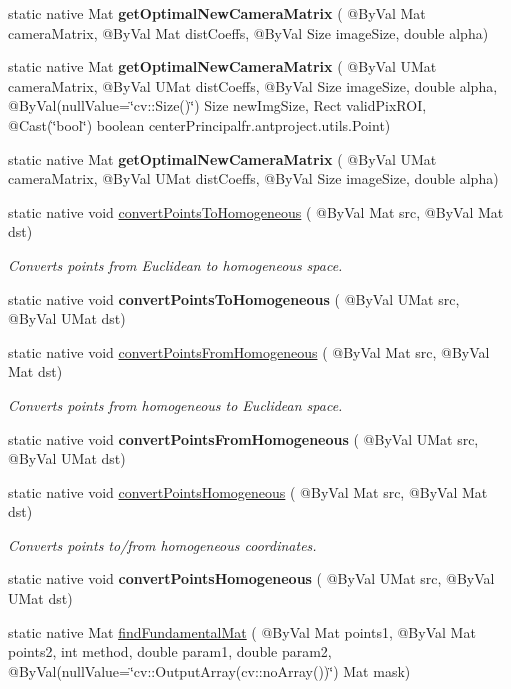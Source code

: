 \begin{DoxyCompactItemize}
static native Mat {\bfseries get\+Optimal\+New\+Camera\+Matrix} ( @By\+Val Mat camera\+Matrix, @By\+Val Mat dist\+Coeffs, @By\+Val Size image\+Size, double alpha)
\item 
static native Mat {\bfseries get\+Optimal\+New\+Camera\+Matrix} ( @By\+Val U\+Mat camera\+Matrix, @By\+Val U\+Mat dist\+Coeffs, @By\+Val Size image\+Size, double alpha, @By\+Val(null\+Value=\char`\"{}cv\+::\+Size()\char`\"{}) Size new\+Img\+Size, Rect valid\+Pix\+R\+OI, @Cast(\char`\"{}bool\char`\"{}) boolean center\+Principal\+fr.antproject.utils.Point)
\item 
static native Mat {\bfseries get\+Optimal\+New\+Camera\+Matrix} ( @By\+Val U\+Mat camera\+Matrix, @By\+Val U\+Mat dist\+Coeffs, @By\+Val Size image\+Size, double alpha)
\item 
static native void \hyperlink{group__calib3d_gaaf5de214950c5c904cd996ac5f73bff6}{convert\+Points\+To\+Homogeneous} ( @By\+Val Mat src, @By\+Val Mat dst)
\begin{DoxyCompactList}\small\item\em Converts points from Euclidean to homogeneous space. \end{DoxyCompactList}\item 
static native void {\bfseries convert\+Points\+To\+Homogeneous} ( @By\+Val U\+Mat src, @By\+Val U\+Mat dst)
\item 
static native void \hyperlink{group__calib3d_ga8d818140f4ee16a68518f61d0dbc2de9}{convert\+Points\+From\+Homogeneous} ( @By\+Val Mat src, @By\+Val Mat dst)
\begin{DoxyCompactList}\small\item\em Converts points from homogeneous to Euclidean space. \end{DoxyCompactList}\item 
static native void {\bfseries convert\+Points\+From\+Homogeneous} ( @By\+Val U\+Mat src, @By\+Val U\+Mat dst)
\item 
static native void \hyperlink{group__calib3d_gaaf02e05437bf63217e14cc47531a387b}{convert\+Points\+Homogeneous} ( @By\+Val Mat src, @By\+Val Mat dst)
\begin{DoxyCompactList}\small\item\em Converts points to/from homogeneous coordinates. \end{DoxyCompactList}\item 
static native void {\bfseries convert\+Points\+Homogeneous} ( @By\+Val U\+Mat src, @By\+Val U\+Mat dst)
\item 
static native Mat \hyperlink{group__calib3d_gaceb84b17990bba04533d8fe02ab1a1d2}{find\+Fundamental\+Mat} ( @By\+Val Mat points1, @By\+Val Mat points2, int method, double param1, double param2, @By\+Val(null\+Value=\char`\"{}cv\+::\+Output\+Array(cv\+::no\+Array())\char`\"{}) Mat mask)

\end{DoxyCompactItemize}
